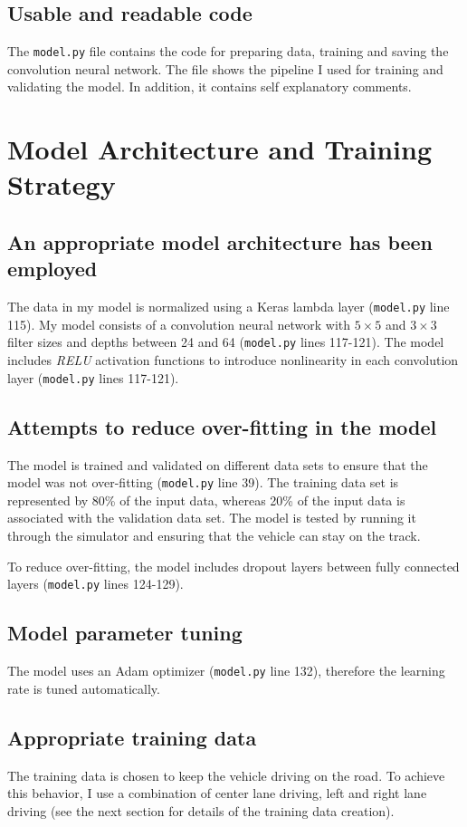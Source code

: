 \documentclass[a4paper,12pt]{article}
\begin{document}
\subsection{Usable and readable code}
The \texttt{model.py} file contains the code for preparing data, training and saving the convolution neural network. The file shows the pipeline I used for training and validating the model. In addition, it contains self explanatory comments.

\section{Model Architecture and Training Strategy}

\subsection{An appropriate model architecture has been employed}
The data in my model is normalized using a Keras lambda layer (\texttt{model.py} line 115). My model consists of a convolution neural network with $5 \times 5$ and $3 \times 3$ filter sizes and depths between 24 and 64 (\texttt{model.py} lines 117-121). The model includes \textit{RELU} activation functions to introduce nonlinearity in each convolution layer (\texttt{model.py} lines 117-121). 

\subsection{Attempts to reduce over-fitting in the model}
The model is trained and validated on different data sets to ensure that the model was not over-fitting (\texttt{model.py} line 39). The training data set is represented by 80\% of the input data, whereas 20\% of the input data is associated with the validation data set. The model is tested by running it through the simulator and ensuring that the vehicle can stay on the track.

To reduce over-fitting, the model includes dropout layers between fully connected layers (\texttt{model.py} lines 124-129).

\subsection{Model parameter tuning}
The model uses an Adam optimizer (\texttt{model.py} line 132), therefore the learning rate is tuned automatically.

\subsection{Appropriate training data}
The training data is chosen to keep the vehicle driving on the road. To achieve this behavior, I use a combination of center lane driving, left and right lane driving (see the next section for details of the training data creation).
\end{document}

